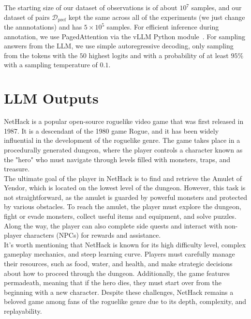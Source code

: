\documentclass{article} %
\begin{document}
The starting size of our dataset of observations is of about $10^7$ samples, and our dataset of pairs $\mathcal D_\text{pref}$ kept the same across all of the experiments (we just change the annnotations) and has $5 \times 10^5$ samples. 
For efficient inference during annotation, we use PagedAttention via the vLLM Python module~\citep{kwon2023efficient}.
For sampling answers from the LLM, we use simple autoregressive decoding, only sampling from the tokens with the $50$  highest logits and with a probability of at least $95\%$ with a sampling temperature of $0.1$.

\section{LLM Outputs}
\label{appendix:llm-outputs}
\begin{modeloutput}[h]
\begin{mymessagebox}[frametitle=What do you know about NetHack and the goal of a player in it? (Llama 2 70b)]
\small{}\selectfont
NetHack is a popular open-source roguelike video game that was first released in 1987. It is a descendant of the 1980 game Rogue, and it has been widely influential in the development of the roguelike genre. The game takes place in a procedurally generated dungeon, where the player controls a character known as the "hero" who must navigate through levels filled with monsters, traps, and treasure.\\

The ultimate goal of the player in NetHack is to find and retrieve the Amulet of Yendor, which is located on the lowest level of the dungeon. However, this task is not straightforward, as the amulet is guarded by powerful monsters and protected by various obstacles. To reach the amulet, the player must explore the dungeon, fight or evade monsters, collect useful items and equipment, and solve puzzles. Along the way, the player can also complete side quests and interact with non-player characters (NPCs) for rewards and assistance. \\

It's worth mentioning that NetHack is known for its high difficulty level, complex gameplay mechanics, and steep learning curve. Players must carefully manage their resources, such as food, water, and health, and make strategic decisions about how to proceed through the dungeon. Additionally, the game features permadeath, meaning that if the hero dies, they must start over from the beginning with a new character. Despite these challenges, NetHack remains a beloved game among fans of the roguelike genre due to its depth, complexity, and replayability.

\end{mymessagebox}
\caption{Answer of Llama 2 70b (chat) on a question about its knowledge of NetHack. The model demonstrate knowledge of both the history of the game, its goal and peculiarities of its gameplay.}
\label{prm:knowledge_llama}
\end{modeloutput}
\end{document}

